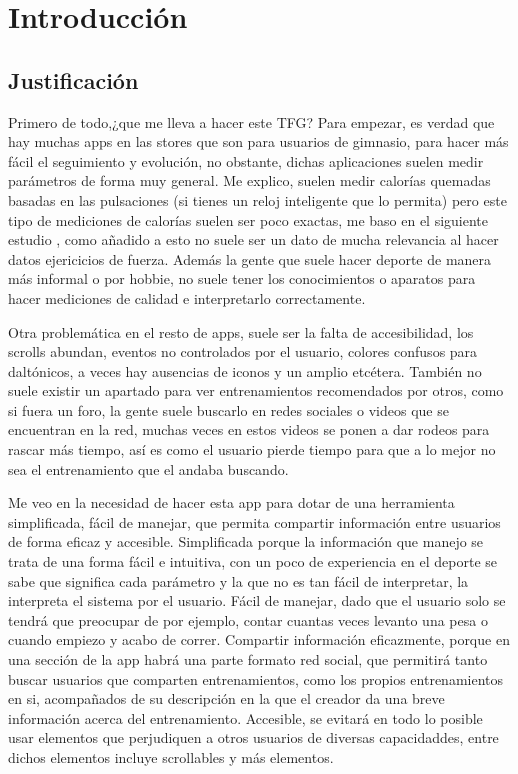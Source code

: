 \chapter{Introducción}

\section{Justificación}

Primero de todo,¿que me lleva a hacer este TFG? Para empezar, es verdad que hay muchas apps en las stores que son para usuarios de gimnasio, para hacer más fácil el seguimiento y evolución, no obstante, dichas aplicaciones suelen medir parámetros de forma muy general. Me explico, suelen medir calorías quemadas basadas en las pulsaciones (si tienes un reloj inteligente que lo permita) pero este tipo de mediciones de calorías suelen ser poco exactas, me baso en el siguiente estudio \cite{jerath2023future}, como añadido a esto no suele ser un dato de mucha relevancia al hacer datos ejericicios de fuerza. Además la gente que suele hacer deporte de manera más informal o por hobbie, no suele tener los conocimientos o aparatos para hacer mediciones de calidad e interpretarlo correctamente. 

Otra problemática en el resto de apps, suele ser la falta de accesibilidad, los scrolls abundan, eventos no controlados por el usuario, colores confusos para daltónicos, a veces hay ausencias de iconos y un amplio etcétera. También no suele existir un apartado para ver entrenamientos recomendados por otros, como si fuera un foro, la gente suele buscarlo en redes sociales o videos que se encuentran en la red, muchas veces en estos videos se ponen a dar rodeos para rascar más tiempo, así es como el usuario pierde tiempo para que a lo mejor no sea el entrenamiento que el andaba buscando.

Me veo en la necesidad de hacer esta app para dotar de una herramienta simplificada, fácil de manejar, que permita compartir información entre usuarios de forma eficaz y accesible. Simplificada porque la información que manejo se trata de una forma fácil e intuitiva, con un poco de experiencia en el deporte se sabe que significa cada parámetro y la que no es tan fácil de interpretar, la interpreta el sistema por el usuario. Fácil de manejar, dado que el usuario solo se tendrá que preocupar de por ejemplo, contar cuantas veces levanto una pesa o cuando empiezo y acabo de correr. Compartir información eficazmente, porque en una sección de la app habrá una parte formato red social, que permitirá tanto buscar usuarios que comparten entrenamientos, como los propios entrenamientos en si, acompañados de su descripción en la que el creador da una breve información acerca del entrenamiento. Accesible, se evitará en todo lo posible usar elementos que perjudiquen a otros usuarios de diversas capacidaddes, entre dichos elementos incluye scrollables y más elementos.

